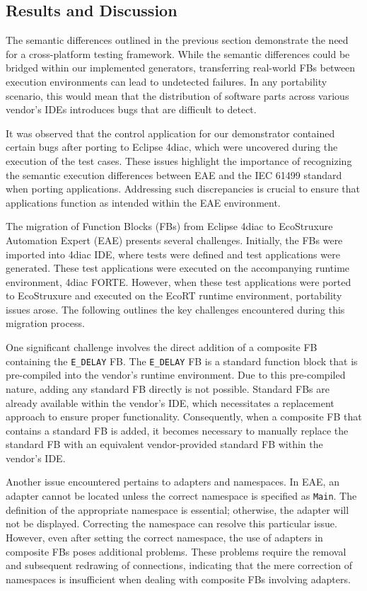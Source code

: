 \begin{bibunit}
\section{Results and Discussion}
\label{sec::results}
The semantic differences outlined in the previous section demonstrate the need for a cross-platform testing framework. While the semantic differences could be bridged within our implemented generators, transferring real-world FBs between execution environments can lead to undetected failures. In any portability scenario, this would mean that the distribution of software parts across various vendor's IDEs introduces bugs that are difficult to detect.

It was observed that the control application for our demonstrator contained certain bugs after porting to Eclipse 4diac, which were uncovered during the execution of the test cases. These issues highlight the importance of recognizing the semantic execution differences between EAE and the IEC 61499 standard when porting applications. Addressing such discrepancies is crucial to ensure that applications function as intended within the EAE environment.

The migration of Function Blocks (FBs) from Eclipse 4diac to EcoStruxure Automation Expert (EAE) presents several challenges. Initially, the FBs were imported into 4diac IDE, where tests were defined and test applications were generated. 
These test applications were executed on the accompanying runtime environment, 4diac FORTE. However, when these test applications were ported to EcoStruxure and executed on the EcoRT runtime environment, portability issues arose. The following outlines the key challenges encountered during this migration process.

One significant challenge involves the direct addition of a composite FB containing the \texttt{E\_DELAY} FB. The \texttt{E\_DELAY} FB is a standard function block that is pre-compiled into the vendor's runtime environment. Due to this pre-compiled nature, adding any standard FB directly is not possible. Standard FBs are already available within the vendor's IDE, which necessitates a replacement approach to ensure proper functionality. Consequently, when a composite FB that contains a standard FB is added, it becomes necessary to manually replace the standard FB with an equivalent vendor-provided standard FB within the vendor's IDE.

Another issue encountered pertains to adapters and namespaces. In EAE, an adapter cannot be located unless the correct namespace is specified as \texttt{Main}. The definition of the appropriate namespace is essential; otherwise, the adapter will not be displayed. Correcting the namespace can resolve this particular issue. However, even after setting the correct namespace, the use of adapters in composite FBs poses additional problems. These problems require the removal and subsequent redrawing of connections, indicating that the mere correction of namespaces is insufficient when dealing with composite FBs involving adapters.


\end{bibunit}
